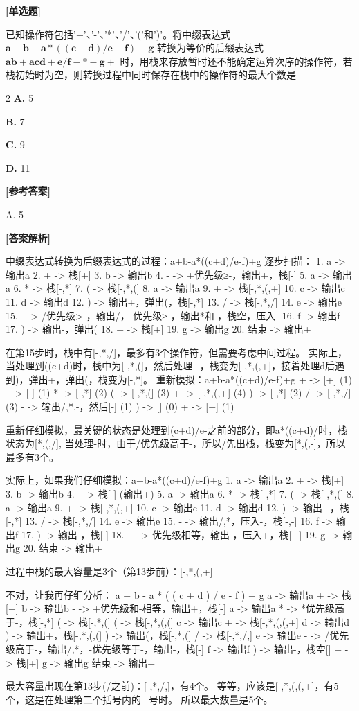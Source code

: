 \documentclass[12pt,a4paper]{article}
\newenvironment{choicequestion}[1][]{%
    \vspace{0.5cm}
    \noindent\textbf{[#1]}
    \vspace{0.2cm}
}{}
\newenvironment{answersection}{%
    \vspace{0.2cm}
    \noindent\textbf{[参考答案]}\\
    \vspace{0.1cm}
}{}
\newenvironment{analysissection}{%
    \vspace{0.2cm}
    \noindent\textbf{[答案解析]}\\
    \vspace{0.1cm}
}{}
\newcounter{questioncounter}
\newcommand{\question}[2]{%
    \stepcounter{questioncounter}%
    \noindent\textbf{\thequestioncounter} #1%
}
\newcommand{\choices}[4]{%
    \begin{multicols}{2}
    \noindent \textbf{A.} #1 \par
    \noindent \textbf{B.} #2 \par
    \noindent \textbf{C.} #3 \par
    \noindent \textbf{D.} #4 \par
    \end{multicols}%
}
\begin{document}
\begin{choicequestion}[单选题]
\question{已知操作符包括'+'、'-'、'*'、'/'、'('和')'。将中缀表达式 $\mathbf{a+b-a*((c+d)/e-f)+g}$ 转换为等价的后缀表达式 $\mathbf{ab+acd+e/f-* -g+}$ 时，用栈来存放暂时还不能确定运算次序的操作符，若栈初始时为空，则转换过程中同时保存在栈中的操作符的最大个数是}{A}
\choices{5}{7}{9}{11}

\begin{answersection}
A. 5
\end{answersection}

\begin{analysissection}
中缀表达式转换为后缀表达式的过程：a+b-a*((c+d)/e-f)+g
逐步扫描：
1. a -> 输出a
2. + -> 栈[+]
3. b -> 输出b
4. - -> +优先级≥-，输出+，栈[-]
5. a -> 输出a
6. * -> 栈[-,*]
7. ( -> 栈[-,*,(]
8. a -> 输出a
9. + -> 栈[-,*,(,+]
10. c -> 输出c
11. d -> 输出d
12. ) -> 输出+，弹出(，栈[-,*]
13. / -> 栈[-,*,/]
14. e -> 输出e
15. - -> /优先级>-，输出/，-优先级≥-，输出*和-，栈空，压入-
16. f -> 输出f
17. ) -> 输出-，弹出(
18. + -> 栈[+]
19. g -> 输出g
20. 结束 -> 输出+

在第15步时，栈中有[-,*,/]，最多有3个操作符，但需要考虑中间过程。
实际上，当处理到((c+d)时，栈中为[-,*,(]，然后处理+，栈变为[-,*,(,+]，接着处理d后遇到)，弹出+，弹出(，栈变为[-,*]。
重新模拟：a+b-a*((c+d)/e-f)+g
+ -> [+] (1)
- -> [-] (1) 
* -> [-,*] (2)
( -> [-,*,(] (3)
+ -> [-,*,(,+] (4)
) -> [-,*] (2)
/ -> [-,*,/] (3)
- -> 输出/,*,-，然后[-] (1)
) -> [] (0)
+ -> [+] (1)

重新仔细模拟，最关键的状态是处理到(c+d)/e-之前的部分，即a*((c+d)/时，栈状态为[*,(,/], 当处理-时，由于/优先级高于-，所以/先出栈，栈变为[*,(,-]，所以最多有3个。

实际上，如果我们仔细模拟：a+b-a*((c+d)/e-f)+g
1. a -> 输出a
2. + -> 栈[+]
3. b -> 输出b
4. - -> 栈[-] (输出+)
5. a -> 输出a
6. * -> 栈[-,*]
7. ( -> 栈[-,*,(]
8. a -> 输出a
9. + -> 栈[-,*,(,+]
10. c -> 输出c
11. d -> 输出d
12. ) -> 输出+，栈[-,*]
13. / -> 栈[-,*,/]
14. e -> 输出e
15. - -> 输出/,*，压入-，栈[-,-]
16. f -> 输出f
17. ) -> 输出-，栈[-]
18. + -> 优先级相等，输出-，压入+，栈[+]
19. g -> 输出g
20. 结束 -> 输出+

过程中栈的最大容量是3个（第13步前）：[-,*,(,+]

不对，让我再仔细分析：
a + b - a * ( ( c + d ) / e - f ) + g
a -> 输出a
+ -> 栈[+]
b -> 输出b
- -> +优先级和-相等，输出+，栈[-]
a -> 输出a
* -> *优先级高于-，栈[-,*]
( -> 栈[-,*,(]
( -> 栈[-,*,(,(]
c -> 输出c
+ -> 栈[-,*,(,(,+]
d -> 输出d
) -> 输出+，栈[-,*,(,(]
) -> 输出(，栈[-,*,(]
/ -> 栈[-,*,/,]
e -> 输出e
- -> /优先级高于-，输出/,*，-优先级等于-，输出-，栈[-]
f -> 输出f
) -> 输出-，栈空[]
+ -> 栈[+]
g -> 输出g
结束 -> 输出+

最大容量出现在第13步(/之前)：[-,*,/,]，有4个。
等等，应该是[-,*,(,(,+]，有5个，这是在处理第二个括号内的+号时。
所以最大数量是5个。
\end{analysissection}
\end{choicequestion}
\end{document}
